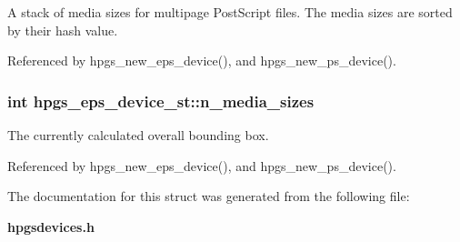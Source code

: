 A stack of media sizes for multipage PostScript files. The media sizes are sorted by their hash value. 

Referenced by hpgs\_\-new\_\-eps\_\-device(), and hpgs\_\-new\_\-ps\_\-device().
\subsubsection[n\_\-media\_\-sizes]{\setlength{\rightskip}{0pt plus 5cm}int {\bf hpgs\_\-eps\_\-device\_\-st::n\_\-media\_\-sizes}}\label{structhpgs__eps__device__st_5a86f397ff80fb7ce5b8548a8ae7ca3f}


The currently calculated overall bounding box. 

Referenced by hpgs\_\-new\_\-eps\_\-device(), and hpgs\_\-new\_\-ps\_\-device().

The documentation for this struct was generated from the following file:\begin{CompactItemize}
\item 
{\bf hpgsdevices.h}\end{CompactItemize}
